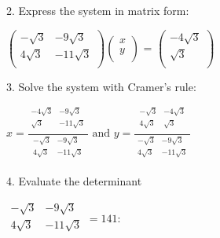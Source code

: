 \documentclass{article}
\begin{document}
2. Express the system in matrix form:

$\left(
        \begin{array}{cc}
-\sqrt{3}  & -9 \sqrt{3}  \\
                4 \sqrt{3} & -11 \sqrt{3} \\
            \end{array}
        \right)\left(
        \begin{array}{c}
x \\
                y \\
            \end{array}
        \right)\text{ = }\left(
        \begin{array}{c}
-4 \sqrt{3} \\
                \sqrt{3}    \\
            \end{array}
        \right)$

3. Solve the system with Cramer's rule:

$x=\frac{
            \begin{array}{|c|c|}
-4 \sqrt{3} & -9 \sqrt{3}  \\
                \sqrt{3}    & -11 \sqrt{3} \\
            \end{array}
        }{
            \begin{array}{|c|c|}
-\sqrt{3}  & -9 \sqrt{3}  \\
                4 \sqrt{3} & -11 \sqrt{3} \\
            \end{array}
        }\text{ and }y=\frac{
            \begin{array}{|c|c|}
-\sqrt{3}  & -4 \sqrt{3} \\
                4 \sqrt{3} & \sqrt{3}    \\
            \end{array}
        }{
            \begin{array}{|c|c|}
-\sqrt{3}  & -9 \sqrt{3}  \\
                4 \sqrt{3} & -11 \sqrt{3} \\
            \end{array}
        }$

4. Evaluate the determinant 

$\begin{array}{|c|c|}
-\sqrt{3}  & -9 \sqrt{3}  \\
            4 \sqrt{3} & -11 \sqrt{3} \\
        \end{array}
        =141:$
\end{document}
